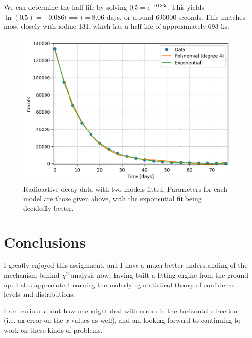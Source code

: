 \documentclass{article}
\begin{document}
We can determine the half life by solving $\displaystyle 0.5 = e^{-0.086t}$. This yields $\ln(0.5)=-0.086t \implies t = 8.06$ days, or around 696000 seconds. This matches most closely with iodine-131, which has a half life of approximately 693 ks.

\begin{figure}[H]
    \centering
    \includegraphics[width=6in]{homework6/decay.png}
    \caption{Radioactive decay data with two models fitted. Parameters for each model are those given above, with the exponential fit being decidedly better.}
    \label{fig:decay}
\end{figure}

\section{Conclusions}

I greatly enjoyed this assignment, and I have a much better understanding of the mechanism behind $\chi^2$ analysis now, having built a fitting engine from the ground up. I also appreciated learning the underlying statistical theory of confidence levels and distributions.

I am curious about how one might deal with errors in the horizontal direction (i.e. an error on the $x$-values as well), and am looking forward to continuing to work on these kinds of problems.
\end{document}

